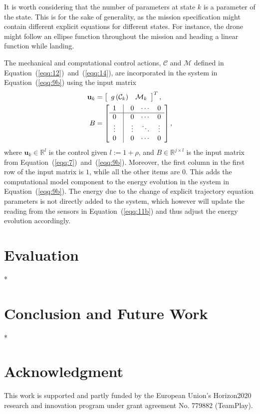 \documentclass[letterpaper,10pt,conference]{ieeeconf}
\begin{document}
It is worth considering that the number of parameters at state $k$ is a parameter of the state. This is for the sake of generality, as the mission specification might contain different explicit equations for different states. For instance, the drone might follow an ellipse function throughout the mission and heading a linear function while landing. 

The mechanical and computational control actions, $\mathcal{C}$ and $\mathcal{M}$ defined in Equation~(\ref{eqq:12})~and~(\ref{eqq:14}), are incorporated in the system in Equation~(\ref{eqq:9b}) using the input matrix
\begin{equation}\begin{split}
  \mathbf{u}_k&=\left[\begin{array}{cc}
    g\left(\mathcal{C}_k\right) & \mathcal{M}_k
  \end{array}\right]^T,\\
  B&=\left[\begin{array}{ccccccc}
    1 & \vline & 0 & \cdots & 0\\\hline
    0 & \vline & 0 & \cdots & 0\\
    \vdots & \vline & \vdots & \ddots & \vdots\\
    0 & \vline & 0 & \cdots & 0
  \end{array}\right],
\end{split}
\end{equation}
where $\mathbf{u}_k\in\mathbb{R}^l$ is the control given $l:=1+\rho$, and $B\in\mathbb{R}^{j\times l}$ is the input matrix from Equation~(\ref{eqq:7})~and~(\ref{eqq:9b}). Moreover, the first column in the first row of the input matrix is $1$, while all the other items are $0$. This adds the computational model component to the energy evolution in the system in Equation~(\ref{eqq:9b}). The energy due to the change of explicit trajectory equation parameters is not directly added to the system, which however will update the reading from the sensors in Equation~(\ref{eqq:11b}) and thus adjust the energy evolution accordingly.

\section{Evaluation}
\label{sec:experimental}

*

\section{Conclusion and Future Work}
\label{sec:conclusion}

*

\section*{Acknowledgment}

This work is supported and partly funded by the European Union's Horizon2020 research and innovation program under grant agreement No. 779882 (TeamPlay).


 
\vspace{0.1ex}
\end{document}
